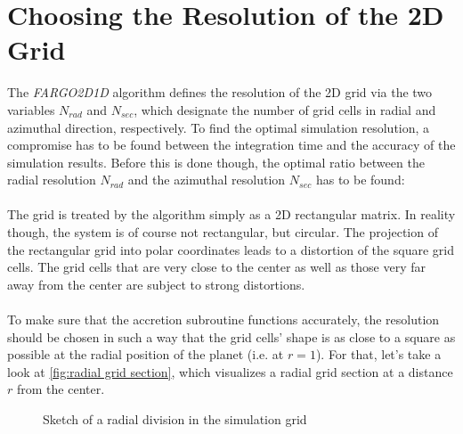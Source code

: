   \section{Choosing the Resolution of the 2D Grid}
    The \textit{FARGO2D1D} algorithm defines the resolution of the 2D grid via 
    the two variables $N_{rad}$
    and $N_{sec}$, which designate the number of grid cells in radial and 
    azimuthal direction, respectively. To find the optimal simulation 
    resolution, a compromise has to be found between the integration time and 
    the accuracy of the simulation results. 
    Before this is done though, the optimal ratio between the radial resolution 
    $N_{rad}$ and the azimuthal resolution $N_{sec}$ has to be found: \\
    \\
    The grid is treated by the algorithm simply as a 2D rectangular matrix. In 
    reality though, the system is of course not rectangular, but circular.
    The projection of the rectangular grid into polar coordinates leads to
    a distortion of the square grid cells. The grid cells that are very close
    to the center as well as those very far away from the center are subject to 
    strong distortions. \\
    \\
    To make sure that the accretion subroutine functions accurately,
    the resolution should be chosen in such a way that the grid cells' shape
    is as close to a square as possible at the radial position of the planet
    (i.e. at $r=1$).
    For that, let's take a look at \autoref{fig:radial grid section}, 
    which visualizes a radial grid section at a distance $r$ from the center. 
    \begin{figure}[h!]
      \centering
      \caption{Sketch of a radial division in the simulation grid}
      \label{fig:radial grid section}
    \end{figure} \ \\ 
